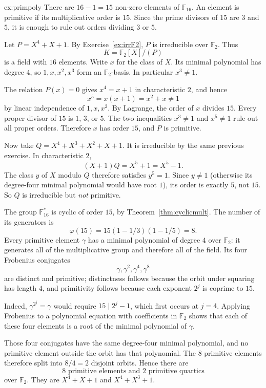 \begin{solution}{ex:primpoly}
\idea There are $16-1=15$ non-zero elements of $\mathbb F_{16}$. An element is primitive if its multiplicative order is $15$. Since the prime divisors of $15$ are $3$ and $5$, it is enough to rule out orders dividing $3$ or $5$.

\writeup Let $P=X^4+X+1$. By Exercise~\ref{ex:irrF2}, $P$ is irreducible over $\mathbb F_2$. Thus
\[
K=\mathbb F_2[X]/(P)
\]
is a field with $16$ elements. Write $x$ for the class of $X$. Its minimal polynomial has degree $4$, so $1,x,x^2,x^3$ form an $\mathbb F_2$-basis. In particular $x^3\ne1$.

The relation $P(x)=0$ gives $x^4=x+1$ in characteristic $2$, and hence
\[
x^5=x(x+1)=x^2+x\ne1
\]
by linear independence of $1,x,x^2$. By Lagrange, the order of $x$ divides $15$. Every proper divisor of $15$ is $1$, $3$, or $5$. The two inequalities $x^3\ne1$ and $x^5\ne1$ rule out all proper orders. Therefore $x$ has order $15$, and $P$ is primitive.

Now take $Q=X^4+X^3+X^2+X+1$. It is irreducible by the same previous exercise. In characteristic $2$,
\[
(X+1)Q=X^5+1=X^5-1.
\]
The class $y$ of $X$ modulo $Q$ therefore satisfies $y^5=1$. Since $y\ne1$ (otherwise its degree-four minimal polynomial would have root $1$), its order is exactly $5$, not $15$. So $Q$ is irreducible but \emph{not} primitive.

The group $\mathbb F_{16}^*$ is cyclic of order $15$, by Theorem~\ref{thm:cyclicmult}. The number of its generators is
\[
\varphi(15)=15(1-1/3)(1-1/5)=8.
\]
Every primitive element $\gamma$ has a minimal polynomial of degree $4$ over $\mathbb F_2$: it generates all of the multiplicative group and therefore all of the field. Its four Frobenius conjugates
\[
\gamma,\gamma^2,\gamma^4,\gamma^8
\]
are distinct and primitive; distinctness follows because the orbit under squaring has length $4$, and primitivity follows because each exponent $2^j$ is coprime to $15$.

Indeed, $\gamma^{2^j}=\gamma$ would require $15\mid2^j-1$, which first
occurs at $j=4$. Applying Frobenius to a polynomial equation with
coefficients in $\mathbb F_2$ shows that each of these four elements
is a root of the minimal polynomial of $\gamma$.

Those four conjugates have the same degree-four minimal polynomial, and no primitive element outside the orbit has that polynomial. The $8$ primitive elements therefore split into $8/4=2$ disjoint orbits. Hence there are
\[
\boxed{8\text{ primitive elements and }2\text{ primitive quartics}}
\]
over $\mathbb F_2$. They are $X^4+X+1$ and $X^4+X^3+1$.
\end{solution}

